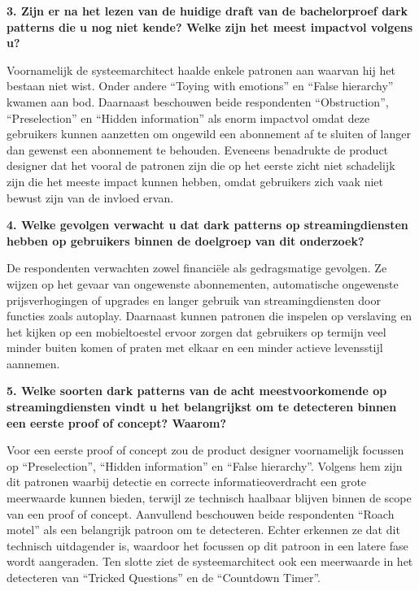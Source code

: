 \vspace{1em}

\textbf{3. Zijn er na het lezen van de huidige draft van de bachelorproef dark patterns die u nog niet kende? Welke zijn het meest impactvol volgens u?}

Voornamelijk de systeemarchitect haalde enkele patronen aan waarvan hij het bestaan niet wist. Onder andere ``Toying with emotions'' en ``False hierarchy'' kwamen aan bod. Daarnaast beschouwen beide respondenten ``Obstruction'', ``Preselection'' en ``Hidden information'' als enorm impactvol omdat deze gebruikers kunnen aanzetten om ongewild een abonnement af te sluiten of langer dan gewenst een abonnement te behouden. Eveneens benadrukte de product designer dat het vooral de patronen zijn die op het eerste zicht niet schadelijk zijn die het meeste impact kunnen hebben, omdat gebruikers zich vaak niet bewust zijn van de invloed ervan.

\vspace{1em}

\textbf{4. Welke gevolgen verwacht u dat dark patterns op streamingdiensten hebben op gebruikers binnen de doelgroep van dit onderzoek?}

De respondenten verwachten zowel financiële als gedragsmatige gevolgen. Ze wijzen op het gevaar van ongewenste abonnementen, automatische ongewenste prijsverhogingen of upgrades en langer gebruik van streamingdiensten door functies zoals autoplay. Daarnaast kunnen patronen die inspelen op verslaving en het kijken op een mobieltoestel ervoor zorgen dat gebruikers op termijn veel minder buiten komen of praten met elkaar en een minder actieve levensstijl aannemen.

\newpage

\textbf{5. Welke soorten dark patterns van de acht meestvoorkomende op streamingdiensten vindt u het belangrijkst om te detecteren binnen een eerste proof of concept? Waarom?}

Voor een eerste proof of concept zou de product designer voornamelijk focussen op ``Preselection'', ``Hidden information'' en ``False hierarchy''. Volgens hem zijn dit patronen waarbij detectie en correcte informatieoverdracht een grote meerwaarde kunnen bieden, terwijl ze technisch haalbaar blijven binnen de scope van een proof of concept. Aanvullend beschouwen beide respondenten ``Roach motel'' als een belangrijk patroon om te detecteren. Echter erkennen ze dat dit technisch uitdagender is, waardoor het focussen op dit patroon in een latere fase wordt aangeraden. Ten slotte ziet de systeemarchitect ook een meerwaarde in het detecteren van ``Tricked Questions'' en de ``Countdown Timer''.

